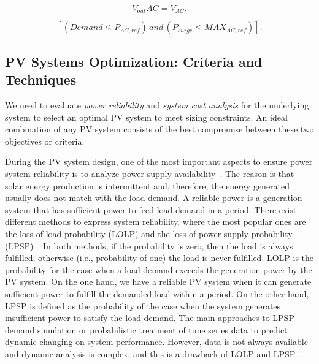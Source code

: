 \documentclass[journal]{IEEEtran}
\begin{document}
\begin{equation}
\label{eq:voutac} 
V_{out}AC = V_{AC}.
\end{equation}

\begin{equation}
\label{eq:invcheck} 
\left[ (Demand \leq P_{AC,ref}) \, and \, (P_{surge} \leq MAX_{AC,ref}) \right].
\end{equation}

\subsection{PV Systems Optimization: Criteria and Techniques}

We need to evaluate \textit{power reliability} and \textit{system cost analysis} for the underlying system to select an optimal PV system to meet sizing constraints. An ideal combination of any PV system consists of the best compromise between these two objectives or criteria.

During the PV system design, one of the most important aspects to ensure power system reliability is to analyze power supply availability~\cite{Alsadi2018}. The reason is that solar energy production is intermittent and, therefore, the energy generated usually does not match with the load demand. A reliable power is a generation system that has sufficient power to feed load demand in a period. There exist different methods to express system reliability, where the most popular ones are the loss of load probability (LOLP) and the loss of power supply probability (LPSP)~\cite{Alsadi2018}. In both methods, if the probability is zero, then the load is always fulfilled; otherwise (i.e., probability of one) the load is never fulfilled. LOLP is the probability for the case when a load demand exceeds the generation power by the PV system. On the one hand,  we have a reliable PV system when it can generate sufficient power to fulfill the demanded load within a period. On the other hand, LPSP is defined as the probability of the case when the system generates insufficient power to satisfy the load demand. The main approaches to LPSP demand simulation or probabilistic treatment of time series data to predict dynamic changing on system performance. However, data is not always available and dynamic analysis is complex; and this is a drawback of LOLP and LPSP~\cite{Alsadi2018}.
\end{document}
